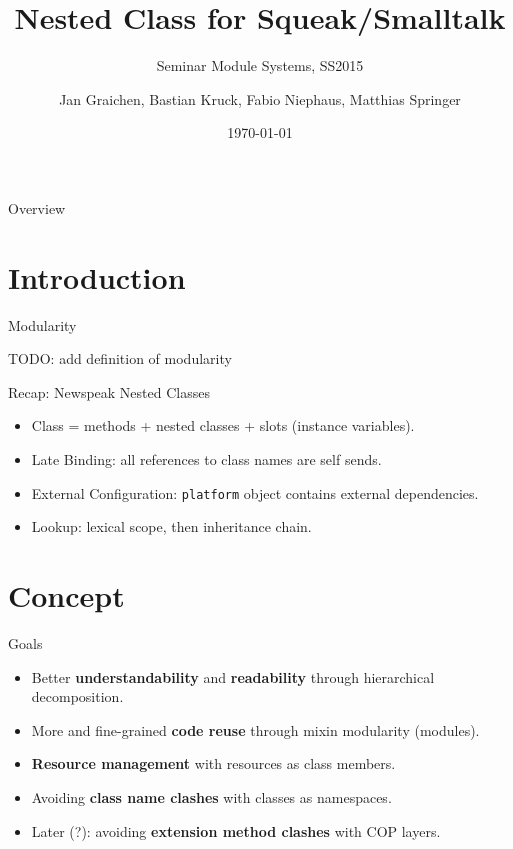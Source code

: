 \documentclass[xcolor=dvipsname, handout]{beamer} %
\title{Nested Class for Squeak/Smalltalk}
\subtitle{Seminar Module Systems, SS2015}
\author{Jan Graichen, Bastian Kruck, Fabio Niephaus, Matthias Springer}
\date{\today}
\institute[2015]{Software Architecture Group, Hasso Plattner Institute}
\begin{document}
\begin{frame}[plain]
	\maketitle
\end{frame}
\begin{frame}{Overview}
	\tableofcontents[hideallsubsections]
\end{frame}


\section{Introduction}

\begin{frame}{Modularity}
\begin{table}
TODO: add definition of modularity
\end{table}
\end{frame}

\begin{frame}{Recap: Newspeak Nested Classes}
  \begin{itemize}
    \item Class = methods + nested classes + slots (instance variables).
    \item Late Binding: all references to class names are self sends.
    \item External Configuration: \texttt{platform} object contains external dependencies.
    \item Lookup: lexical scope, then inheritance chain.
  \end{itemize}
\end{frame}

\section{Concept}
\begin{frame}{Goals}
  \begin{itemize}
    \item Better \textbf{understandability} and \textbf{readability} through hierarchical decomposition.
    \item More and fine-grained \textbf{code reuse} through mixin modularity (modules).
    \item \textbf{Resource management} with resources as class members.
    \item Avoiding \textbf{class name clashes} with classes as namespaces.
    \item Later (?): avoiding \textbf{extension method clashes} with COP layers.
  \end{itemize}
\end{frame}
\end{document}
